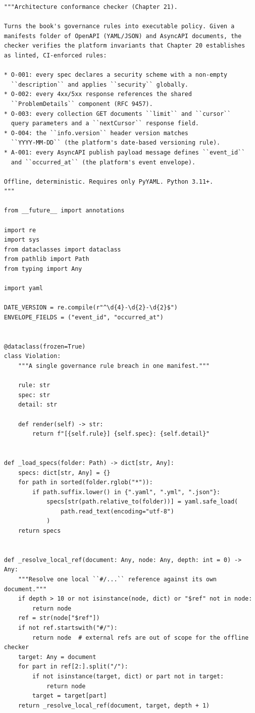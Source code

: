 \begin{verbatim}
"""Architecture conformance checker (Chapter 21).

Turns the book's governance rules into executable policy. Given a
manifests folder of OpenAPI (YAML/JSON) and AsyncAPI documents, the
checker verifies the platform invariants that Chapter 20 establishes
as linted, CI-enforced rules:

* O-001: every spec declares a security scheme with a non-empty
  ``description`` and applies ``security`` globally.
* O-002: every 4xx/5xx response references the shared
  ``ProblemDetails`` component (RFC 9457).
* O-003: every collection GET documents ``limit`` and ``cursor``
  query parameters and a ``nextCursor`` response field.
* O-004: the ``info.version`` header version matches
  ``YYYY-MM-DD`` (the platform's date-based versioning rule).
* A-001: every AsyncAPI publish payload message defines ``event_id``
  and ``occurred_at`` (the platform's event envelope).

Offline, deterministic. Requires only PyYAML. Python 3.11+.
"""

from __future__ import annotations

import re
import sys
from dataclasses import dataclass
from pathlib import Path
from typing import Any

import yaml

DATE_VERSION = re.compile(r"^\d{4}-\d{2}-\d{2}$")
ENVELOPE_FIELDS = ("event_id", "occurred_at")


@dataclass(frozen=True)
class Violation:
    """A single governance rule breach in one manifest."""

    rule: str
    spec: str
    detail: str

    def render(self) -> str:
        return f"[{self.rule}] {self.spec}: {self.detail}"


def _load_specs(folder: Path) -> dict[str, Any]:
    specs: dict[str, Any] = {}
    for path in sorted(folder.rglob("*")):
        if path.suffix.lower() in {".yaml", ".yml", ".json"}:
            specs[str(path.relative_to(folder))] = yaml.safe_load(
                path.read_text(encoding="utf-8")
            )
    return specs


def _resolve_local_ref(document: Any, node: Any, depth: int = 0) -> Any:
    """Resolve one local ``#/...`` reference against its own document."""
    if depth > 10 or not isinstance(node, dict) or "$ref" not in node:
        return node
    ref = str(node["$ref"])
    if not ref.startswith("#/"):
        return node  # external refs are out of scope for the offline checker
    target: Any = document
    for part in ref[2:].split("/"):
        if not isinstance(target, dict) or part not in target:
            return node
        target = target[part]
    return _resolve_local_ref(document, target, depth + 1)



\end{verbatim}
